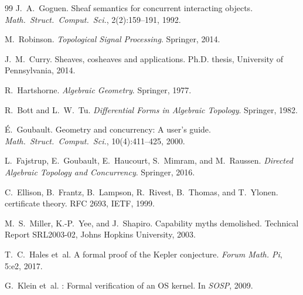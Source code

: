 \documentclass[11pt]{article}
\begin{document}
\begin{thebibliography}{99}
J.~A.~Goguen.
\newblock Sheaf semantics for concurrent interacting objects.
\newblock \emph{Math.~Struct.~Comput.~Sci.}, 2(2):159--191, 1992.

M.~Robinson.
\newblock \emph{Topological Signal Processing}.
\newblock Springer, 2014.

J.~M.~Curry.
\newblock Sheaves, cosheaves and applications.
\newblock Ph.D. thesis, University of Pennsylvania, 2014.

R.~Hartshorne.
\newblock \emph{Algebraic Geometry}.
\newblock Springer, 1977.

R.~Bott and L.~W.~Tu.
\newblock \emph{Differential Forms in Algebraic Topology}.
\newblock Springer, 1982.

{\'E}.~Goubault.
\newblock Geometry and concurrency: A user's guide.
\newblock \emph{Math.~Struct.~Comput.~Sci.}, 10(4):411--425, 2000.

L.~Fajstrup, E.~Goubault, E.~Haucourt, S.~Mimram, and M.~Raussen.
\newblock \emph{Directed Algebraic Topology and Concurrency}.
\newblock Springer, 2016.

C.~Ellison, B.~Frantz, B.~Lampson, R.~Rivest, B.~Thomas, and T.~Ylonen.
 certificate theory.
\newblock RFC 2693, IETF, 1999.

M.~S.~Miller, K.-P.~Yee, and J.~Shapiro.
\newblock Capability myths demolished.
\newblock Technical Report SRL2003-02, Johns Hopkins University, 2003.

T.~C.~Hales et~al.
\newblock A formal proof of the {K}epler conjecture.
\newblock \emph{Forum Math. Pi}, 5:e2, 2017.

G.~Klein et~al.
: Formal verification of an {OS} kernel.
\newblock In \emph{SOSP}, 2009.
\end{thebibliography}
\end{document}
